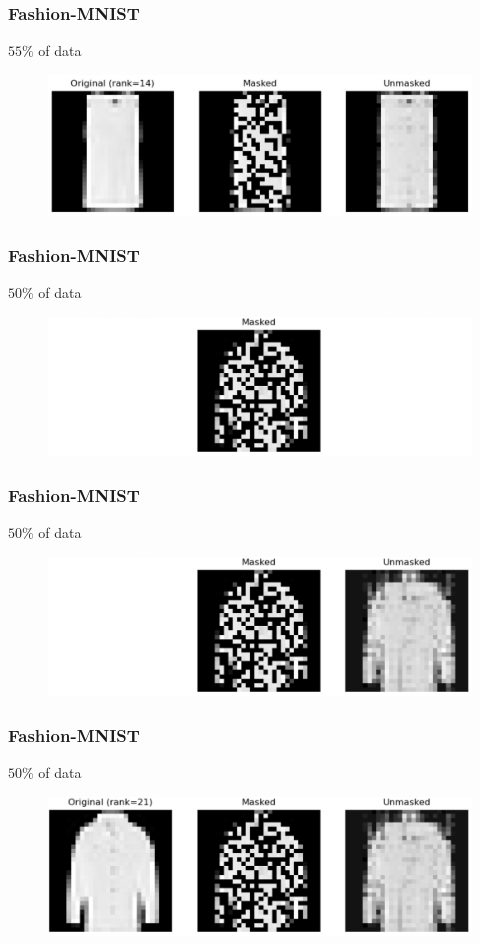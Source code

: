 \documentclass[
	11pt, %
]{beamer}
\begin{document}
\begin{frame}
	\frametitle{Fashion-MNIST}
	$55 \%$ of data
	\begin{figure}
		\centering
		\includegraphics[scale=.3]{assets/mc_ex1_orig.jpg}
	\end{figure}
\end{frame}

\begin{frame}
	\frametitle{Fashion-MNIST}
	$50 \%$ of data
	\begin{figure}
		\centering
		\includegraphics[scale=.2]{assets/mc_ex2_masked.jpeg}
	\end{figure}
\end{frame}

\begin{frame}
	\frametitle{Fashion-MNIST}
	$50 \%$ of data
	\begin{figure}
		\centering
		\includegraphics[scale=.2]{assets/mc_ex2_unmasked.jpeg}
	\end{figure}
\end{frame}

\begin{frame}
	\frametitle{Fashion-MNIST}
	$50 \%$ of data
	\begin{figure}
		\centering
		\includegraphics[scale=.2]{assets/mc_ex2_orig.jpg}
	\end{figure}
\end{frame}
\end{document}
